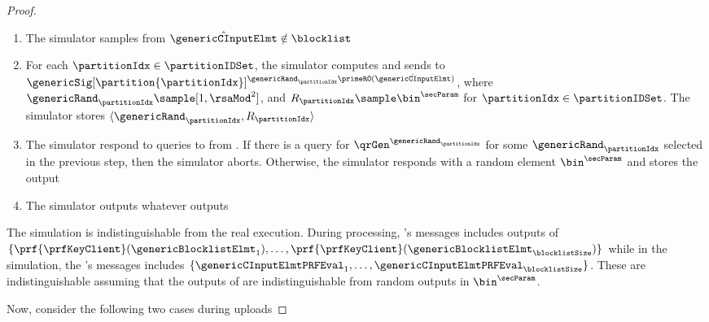 \begin{proof}
\begin{itemize}
\begin{enumerate}[resume]
\begin{enumerate}
\item The simulator samples from $\hat{\genericCInputElmt} \notin \blocklist$
\item For each $\partitionIdx \in \partitionIDSet$, the simulator computes and sends to \server $\genericSig[\partition{\partitionIdx}]^{\genericRand_\partitionIdx \primeRO(\hat{\genericCInputElmt})}$, where $\genericRand_\partitionIdx \sample [1, \rsaMod^2]$, and $R_\partitionIdx \sample \bin^{\secParam}$ for $\partitionIdx \in \partitionIDSet$.  The simulator stores $\langle \genericRand_\partitionIdx, R_\partitionIdx \rangle$
\item The simulator respond to queries to \ro from \server. If there is a query for $\qrGen^{\genericRand_\partitionIdx}$ for some $\genericRand_\partitionIdx$ selected in the previous step, then the simulator aborts. Otherwise, the simulator responds with a random element $\bin^{\secParam}$ and stores the output
\item The simulator outputs whatever \server outputs
\end{enumerate}
\end{enumerate}
\end{itemize}


The simulation is indistinguishable from the real execution. During processing, \server's messages includes outputs of \authOPRFFunc 
$\{ \prf{\prfKeyClient}(\genericBlocklistElmt_1), \dots,   \prf{\prfKeyClient}(\genericBlocklistElmt_\blocklistSize)\}$
while in the simulation, the \server's messages includes $\{ \genericCInputElmtPRFEval_1, \dots, \genericCInputElmtPRFEval_\blocklistSize \}$. These are indistinguishable assuming that the outputs of \prf are indistinguishable from random outputs in $\bin^{\secParam}$. 




Now, consider the following two cases during uploads



\end{proof}
